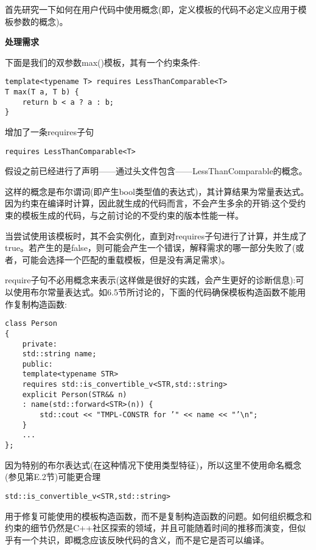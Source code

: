 
首先研究一下如何在用户代码中使用概念(即，定义模板的代码不必定义应用于模板参数的概念)。

\noindent
\textbf{处理需求}

下面是我们的双参数max()模板，其有一个约束条件:

\begin{lstlisting}[style=styleCXX]
template<typename T> requires LessThanComparable<T>
T max(T a, T b) {
	return b < a ? a : b;
}
\end{lstlisting}

增加了一条requires子句

\begin{lstlisting}[style=styleCXX]
requires LessThanComparable<T>
\end{lstlisting}

假设之前已经进行了声明——通过头文件包含——LessThanComparable的概念。

这样的概念是布尔谓词(即产生bool类型值的表达式)，其计算结果为常量表达式。因为约束在编译时计算，因此就生成的代码而言，不会产生多余的开销:这个受约束的模板生成的代码，与之前讨论的不受约束的版本性能一样。

当尝试使用该模板时，其不会实例化，直到对requires子句进行了计算，并生成了true。若产生的是false，则可能会产生一个错误，解释需求的哪一部分失败了(或者，可能会选择一个匹配的重载模板，但是没有满足需求)。

require子句不必用概念来表示(这样做是很好的实践，会产生更好的诊断信息):可以使用布尔常量表达式。如6.5节所讨论的，下面的代码确保模板构造函数不能用作复制构造函数:

\begin{lstlisting}[style=styleCXX]
class Person
{
	private:
	std::string name;
	public:
	template<typename STR>
	requires std::is_convertible_v<STR,std::string>
	explicit Person(STR&& n)
	: name(std::forward<STR>(n)) {
		std::cout << "TMPL-CONSTR for ’" << name << "’\n";
	}
	...
};
\end{lstlisting}

因为特别的布尔表达式(在这种情况下使用类型特征)，所以这里不使用命名概念(参见第E.2节)可能更合理

\begin{lstlisting}[style=styleCXX]
std::is_convertible_v<STR,std::string>
\end{lstlisting}

用于修复可能使用的模板构造函数，而不是复制构造函数的问题。如何组织概念和约束的细节仍然是C++社区探索的领域，并且可能随着时间的推移而演变，但似乎有一个共识，即概念应该反映代码的含义，而不是它是否可以编译。

